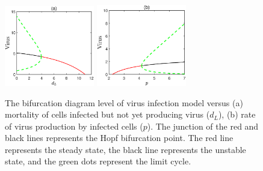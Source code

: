 \documentclass{CMHPhD-SIVD}
\begin{document}
\begin{figure}[h!]
\centering
\includegraphics[height=0.20\textheight,width=0.35\textwidth]{A4.eps}
\includegraphics[height=0.20\textheight,width=0.35\textwidth]{A5.eps}
\vspace{3mm}
\caption{The bifurcation diagram level of virus infection model versus (a) mortality of cells infected but not yet producing virus ($d_L$), (b) rate of virus production by infected cells ($p$). The junction of the red and black lines represents the Hopf bifurcation point. The red line represents the steady state, the black line represents the unstable state, and the green dots represent the limit cycle.}
\label{Fig.6}
\end{figure}
\end{document}
